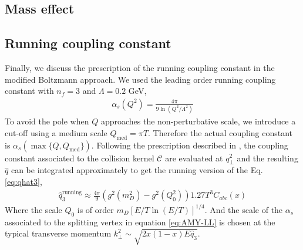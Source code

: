 \subsection{Mass effect}

\subsection{Running coupling constant}
Finally, we discuss the prescription of the running coupling constant in the modified Boltzmann approach.
We used the leading order running coupling constant with $n_f = 3$ and $\Lambda = 0.2$ GeV, 
\begin{eqnarray}
\alpha_s(Q^2) = \frac{4\pi}{9\ln\left(Q^2/\Lambda^2\right)}
\end{eqnarray}
To avoid the pole when $Q$ approaches the non-perturbative scale, we introduce a cut-off using a medium scale $Q_{\textrm{med}} = \pi T$. 
Therefore the actual coupling constant is $\alpha_s(\max\{Q, Q_{\textrm{med}}\})$.
Following the prescription described in \cite{Arnold:2008zu}, the coupling constant associated to the collision kernel $\mathcal{C}$ are evaluated at $q_\perp^2$ and the resulting $\hat{q}$ can be integrated approximately to get the running version of the Eq. \ref{eq:qhat3},
\begin{eqnarray}
\hat{q}_3^{\textrm{running}} \approx \frac{4\pi}{9}\left(g^2(m_D^2) - g^2(Q_0^2)\right) 1.27 T^3 C_{abc}(x)
\label{eq:q3running}
\end{eqnarray}
Where the scale $Q_0$ is of order $m_D [E/T \ln(E/T)]^{1/4}$.
And the scale of the $\alpha_s$ associated to the splitting  vertex in equation \ref{eq:AMY-LL} is chosen at the typical transverse momentum $k_\perp^2 \sim \sqrt{2x(1-x)E\hat{q}_3}$.


